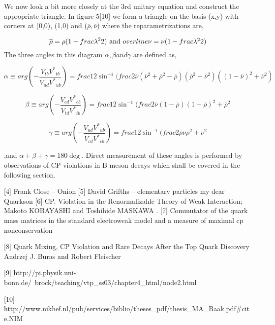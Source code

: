 \documentclass[11pt,onecolumn]{article}
\begin{document}
We now look a bit more closely at the 3rd unitary equation and construct the appropriate triangle. In figure {5}[10] we form a triangle on the basis (x,y) with corners at (0,0), (1,0) and ($\overline{\rho},\overline{\nu}$) where the reparametrizations are,

\[\overline{\rho}=\rho(1-frac{\lambda^2}{2})$ and $\\overline{\nu}=\nu(1-frac{\lambda^2}{2})\]
The three angles in this diagram $\alpha , \beta and \gamma$ are defined as,

\[\alpha\equiv arg(-\frac{V_{tb}V^*{}_{tb}}{V_{ud}V^*{}_{ub}}) =frac{1}{2}\sin^{-1}(frac{2\overline{\nu}(\overline{\nu}^2+\overline{\rho}^2-\overline{\rho})}{(\overline{\rho}^2+\overline{\nu}^2)((1-\overline{\nu})^2+\overline{\nu}^2)}\]

\[\beta\equiv arg(-\frac{V_{cd}V^*{}_{cb}}{V_{td}V^*{}_{tb}}) = frac{1}{2}\sin^{-1}(frac{2\overline{\nu}(1-\overline{\rho})}{(1-\overline{\rho})^2+\overline{\rho}^2}\]

\[\gamma\equiv arg(-\frac{V_{ud}V^*{}_{ub}}{V_{cd}V^*{}_{cb}}) = frac{1}{2}\sin^{-1}(frac{2\overline{\rho}\overline{\nu}}{\overline{\rho}^2+\overline{\nu}^2}\]

,and $\alpha + \beta + \gamma = 180\deg$. Direct measurement of these angles is performed by observations of CP violations in B meson decays which shall be covered in the following section.

[4] Frank Close – Onion
[5] David Grifths – elementary particles my dear Quarkson
[6] CP. Violation in the Renormalizahle Theory of Weak Interaction; Makoto KOBAYASHI and Toshihide MASKAWA
.
[7] Commutator of the quark mass matrices in the standard electroweak model and a measure of maximal cp nonconservation

[8] Quark Mixing, CP Violation and Rare Decays After the Top Quark Discovery Andrzej J. Buras and Robert Fleischer

[9] http://pi.physik.uni-bonn.de/~brock/teaching/vtp_ss03/chapter4_html/node2.html

[10] http://www.nikhef.nl/pub/services/biblio/theses_pdf/thesis_MA_Baak.pdf#cite.NIM
\end{document}
